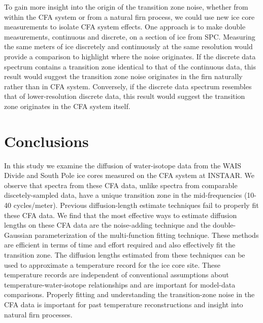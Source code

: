 \documentclass[draft, jgrga]{AGUTeX}
\begin{document}
\begin{article}
To gain more insight into the origin of the transition zone noise, whether from within the CFA system or from a natural firn process, we could use new ice core measurements to isolate CFA system effects. One approach is to make double measurements, continuous and discrete, on a section of ice from SPC. Measuring the same meters of ice discretely and continuously at the same resolution would provide a comparison to highlight where the noise originates. If the discrete data spectrum contains a transition zone identical to that of the continuous data, this result would suggest the transition zone noise originates in the firn naturally rather than in CFA system. Conversely, if the discrete data spectrum resembles that of lower-resolution discrete data, this result would suggest the transition zone originates in the CFA system itself.


\section{Conclusions}

In this study we examine the diffusion of water-isotope data from the WAIS Divide and South Pole ice cores measured on the CFA system at INSTAAR. We observe that spectra from these CFA data, unlike spectra from comparable discetely-sampled data, have a unique transition zone in the mid-frequencies (10-40 cycles/meter). Previous diffusion-length estimate techniques fail to properly fit these CFA data. We find that the most effective ways to estimate diffusion lengths on these CFA data are the noise-adding technique and the double-Gaussian parameterization of the multi-function fitting technique. These methods are efficient in terms of time and effort required and also effectively fit the transition zone. The diffusion lengths estimated from these techniques can be used to approximate a temperature record for the ice core site. These temperature records are independent of conventional assumptions about temperature-water-isotope relationships and are important for model-data comparisons. Properly fitting and understanding the transition-zone noise in the CFA data is important for past temperature reconstructions and insight into natural firn processes.



\end{article}
\end{document}
